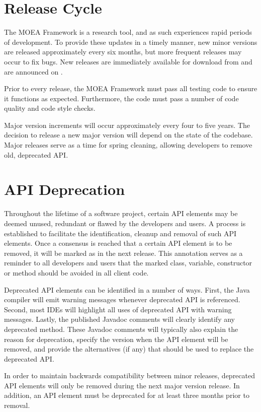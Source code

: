 \section{Release Cycle}
The MOEA Framework is a research tool, and as such experiences rapid periods of development.  To provide these updates in a timely manner, new minor versions are released approximately every six months, but more frequent releases may occur to fix bugs.  New releases are immediately available for download from  and are announced on .

Prior to every release, the MOEA Framework must pass all testing code to ensure it functions as expected.  Furthermore, the code must pass a number of code quality and code style checks.

Major version increments will occur approximately every four to five years.  The decision to release a new major version will depend on the state of the codebase.  Major releases serve as a time for spring cleaning, allowing developers to remove old, deprecated API.

\section{API Deprecation}
Throughout the lifetime of a software project, certain API elements may be deemed unused, redundant or flawed by the developers and users.  A process is established to facilitate the identification, cleanup and removal of such API elements.  Once a consensus is reached that a certain API element is to be removed, it will be marked as  in the next release.  This annotation serves as a reminder to all developers and users that the marked class, variable, constructor or method should be avoided in all client code.

Deprecated API elements can be identified in a number of ways.  First, the Java compiler will emit warning messages whenever deprecated API is referenced.  Second, most IDEs will highlight all uses of deprecated API with warning messages.  Lastly, the published Javadoc comments will clearly identify any deprecated method.  These Javadoc comments will typically also explain the reason for deprecation, specify the version when the API element will be removed, and provide the alternatives (if any) that should be used to replace the deprecated API.

In order to maintain backwards compatibility between minor releases, deprecated API elements will only be removed during the next major version release.  In addition, an API element must be deprecated for at least three months prior to removal.


